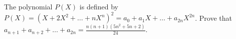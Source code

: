 The polynomial $P(X)$ is defined by $P(X)=(X+2X^{2}+\ldots +nX^{n})^{2}=a_{0}+a_{1}X+\ldots +a_{2n}X^{2n}$. Prove that $a_{n+1}+a_{n+2}+\ldots +a_{2n}=\frac{n(n+1)(5n^{2}+5n+2)}{24}$.
